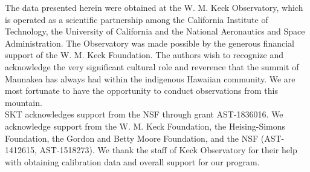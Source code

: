 \documentclass[]{spie}  %
\begin{document}
\acknowledgments

The data presented herein were obtained at the W. M. Keck Observatory, which is operated as a scientific partnership among the California Institute of Technology, the University of California and the National Aeronautics and Space Administration.
The Observatory was made possible by the generous financial support of the W. M. Keck Foundation.
The authors wish to recognize and acknowledge the very significant cultural role and reverence that the summit of Maunakea has always had within the indigenous Hawaiian community.
We are most fortunate to have the opportunity to conduct observations from this mountain.
\\
\indent SKT acknowledges support from the NSF through grant AST-1836016. We acknowledge support from the W. M. Keck Foundation, the Heising-Simons Foundation, the Gordon and Betty Moore Foundation, and the NSF (AST-1412615, AST-1518273). We thank the staff of Keck Observatory for their help with obtaining calibration data and overall support for our program.

\end{document}
